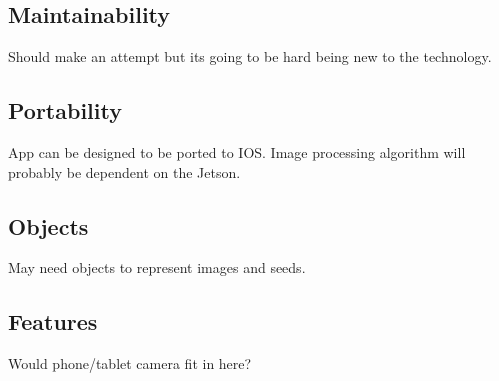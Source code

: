 \documentclass[onecolumn, draftclsnofoot,10pt, compsoc]{IEEEtran}
\begin{document}
\subsection{Maintainability}
Should make an attempt but its going to be hard being new to the technology.

\subsection{Portability}
App can be designed to be ported to IOS.
Image processing algorithm will probably be dependent on the Jetson.

\subsection{Objects}
May need objects to represent images and seeds.

\subsection{Features}
Would phone/tablet camera fit in here?
\end{document}
